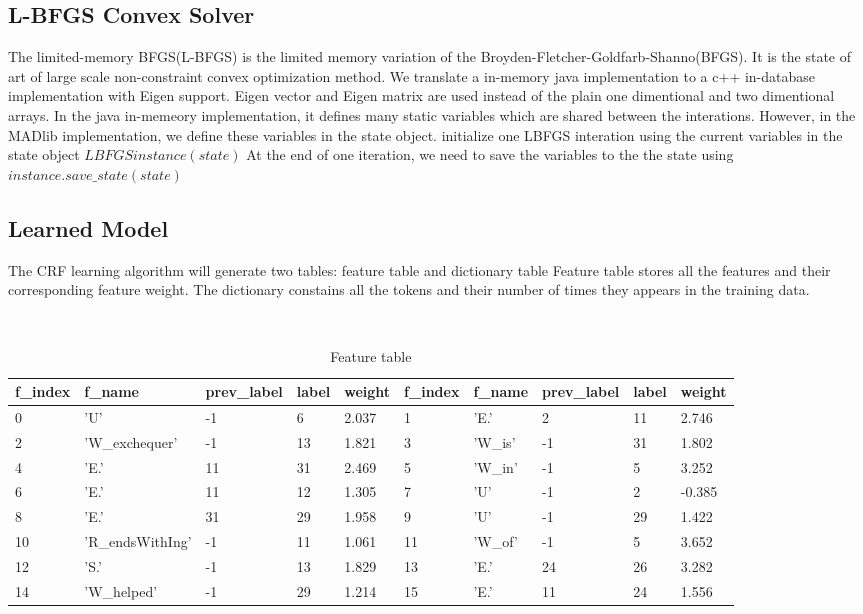 \subsection{L-BFGS Convex Solver}
The limited-memory BFGS(L-BFGS) is the limited memory variation of the Broyden-Fletcher-Goldfarb-Shanno(BFGS).
It is the state of art of large scale non-constraint convex optimization method.
We translate a in-memory java implementation to a c++ in-database implementation with Eigen support.
Eigen vector and Eigen matrix are used instead of the plain one dimentional and two dimentional arrays.
In the java in-memeory implementation, it defines many static variables which are shared between the interations.
However, in the MADlib implementation, we define these variables in the state object.
initialize one LBFGS interation using the current variables in the state object $LBFGS instance(state)$
At the end of one iteration, we need to save the variables to the the state using $instance.save\_state(state)$


\subsection{Learned Model}
The CRF learning algorithm will generate two tables: feature table and dictionary table
Feature table stores all the features and their corresponding feature weight.
The dictionary constains all the tokens and their number of times they appears in the training data.

\begin {table}
\caption {Feature table} \label{tab:title} 
\begin{center}
    \scriptsize\tt
    \begin{tabular}{ | l | l | l | l | l || l | l | l | l | l | }
    \hline
    f\_index & f\_name & prev\_label & label & weight & f\_index & f\_name & prev\_label & label & weight\\
    \hline
    0&'U'&-1&6&2.037& 1&'E.'&2&11&2.746   \\
    2&'W\_exchequer'&-1&13&1.821& 3&'W\_is'&-1&31&1.802 \\
    4&'E.'&11&31&2.469& 5&'W\_in'&-1&5&3.252 \\
    6&'E.'&11&12&1.305& 7&'U'&-1&2&-0.385 \\
    8&'E.'&31&29&1.958& 9&'U'&-1&29&1.422 \\
    10&'R\_endsWithIng'&-1&11&1.061&11&'W\_of'&-1&5&3.652 \\
    12&'S.'&-1&13&1.829& 13&'E.'&24&26&3.282 \\
    14&'W\_helped'&-1&29&1.214& 15&'E.'&11&24&1.556 \\
    \hline
    \end{tabular}
\end{center}
\end {table}

